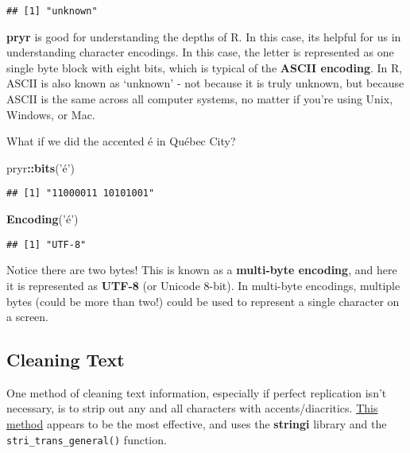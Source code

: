 \documentclass[
]{book}
\newenvironment{Shaded}{\begin{snugshade}}{\end{snugshade}}
\newcommand{\KeywordTok}[1]{\textcolor[rgb]{0.13,0.29,0.53}{\textbf{#1}}}
\newcommand{\NormalTok}[1]{#1}
\newcommand{\OperatorTok}[1]{\textcolor[rgb]{0.81,0.36,0.00}{\textbf{#1}}}
\newcommand{\StringTok}[1]{\textcolor[rgb]{0.31,0.60,0.02}{#1}}
\begin{document}
\begin{verbatim}
## [1] "unknown"
\end{verbatim}

\textbf{pryr} is good for understanding the depths of R. In this case, its helpful for us in understanding character encodings. In this case, the letter is represented as one single byte block with eight bits, which is typical of the \textbf{ASCII encoding}. In R, ASCII is also known as `unknown' - not because it is truly unknown, but because ASCII is the same across all computer systems, no matter if you're using Unix, Windows, or Mac.

What if we did the accented é in Québec City?

\begin{Shaded}
\begin{Highlighting}[]
\NormalTok{pryr}\OperatorTok{::}\KeywordTok{bits}\NormalTok{(}\StringTok{'é'}\NormalTok{)}
\end{Highlighting}
\end{Shaded}

\begin{verbatim}
## [1] "11000011 10101001"
\end{verbatim}

\begin{Shaded}
\begin{Highlighting}[]
\KeywordTok{Encoding}\NormalTok{(}\StringTok{'é'}\NormalTok{)}
\end{Highlighting}
\end{Shaded}

\begin{verbatim}
## [1] "UTF-8"
\end{verbatim}

Notice there are two bytes! This is known as a \textbf{multi-byte encoding}, and here it is represented as \textbf{UTF-8} (or Unicode 8-bit). In multi-byte encodings, multiple bytes (could be more than two!) could be used to represent a single character on a screen.

\hypertarget{cleaning-text}{%
\subsection{Cleaning Text}\label{cleaning-text}}

One method of cleaning text information, especially if perfect replication isn't necessary, is to strip out any and all characters with accents/diacritics. \href{https://stackoverflow.com/questions/26393341/r-delete-accents-in-string}{This method} appears to be the most effective, and uses the \textbf{stringi} library and the \texttt{stri\_trans\_general()} function.
\end{document}
